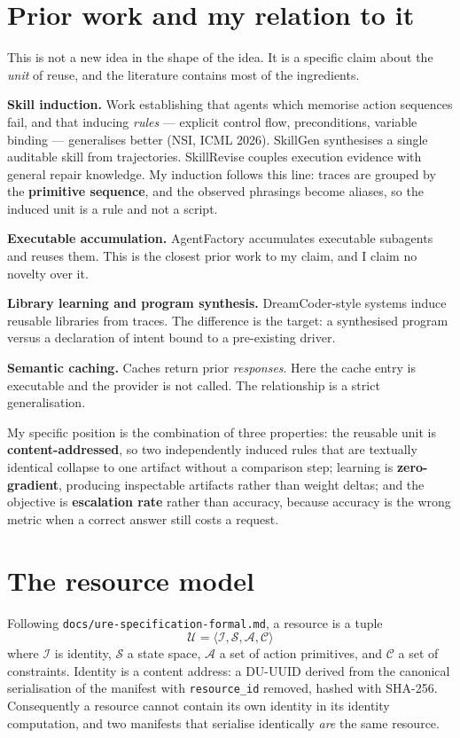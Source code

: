 \documentclass[11pt,twocolumn]{article}
\begin{document}
\section{Prior work and my relation to it}

This is not a new idea in the shape of the idea. It is a specific claim about
the \emph{unit} of reuse, and the literature contains most of the ingredients.

\textbf{Skill induction.} Work establishing that agents which memorise action
sequences fail, and that inducing \emph{rules} --- explicit control flow,
preconditions, variable binding --- generalises better (NSI, ICML 2026).
SkillGen synthesises a single auditable skill from trajectories. SkillRevise
couples execution evidence with general repair knowledge. My induction follows
this line: traces are grouped by the \textbf{primitive sequence}, and the
observed phrasings become aliases, so the induced unit is a rule and not a
script.

\textbf{Executable accumulation.} AgentFactory accumulates executable subagents
and reuses them. This is the closest prior work to my claim, and I claim no
novelty over it.

\textbf{Library learning and program synthesis.} DreamCoder-style systems induce
reusable libraries from traces. The difference is the target: a synthesised
program versus a declaration of intent bound to a pre-existing driver.

\textbf{Semantic caching.} Caches return prior \emph{responses}. Here the cache
entry is executable and the provider is not called. The relationship is a strict
generalisation.

My specific position is the combination of three properties: the reusable unit
is \textbf{content-addressed}, so two independently induced rules that are
textually identical collapse to one artifact without a comparison step; learning
is \textbf{zero-gradient}, producing inspectable artifacts rather than weight
deltas; and the objective is \textbf{escalation rate} rather than accuracy,
because accuracy is the wrong metric when a correct answer still costs a
request.

\section{The resource model}

Following \texttt{docs/ure-specification-formal.md}, a resource is a tuple
\[
  \mathcal{U} = \langle \mathcal{I}, \mathcal{S}, \mathcal{A}, \mathcal{C} \rangle
\]
where $\mathcal{I}$ is identity, $\mathcal{S}$ a state space, $\mathcal{A}$ a set
of action primitives, and $\mathcal{C}$ a set of constraints. Identity is a
content address: a DU-UUID derived from the canonical serialisation of the
manifest with \texttt{resource\_id} removed, hashed with SHA-256. Consequently a
resource cannot contain its own identity in its identity computation, and two
manifests that serialise identically \emph{are} the same resource.
\end{document}

